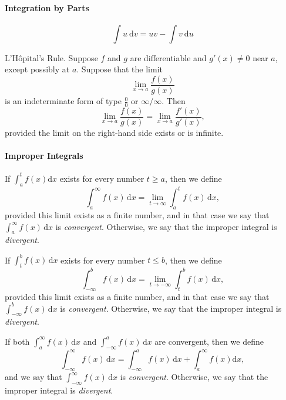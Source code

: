 \documentclass[captions=tableheading]{scrbook}
\begin{document}
\paragraph*{Integration by Parts}

\begin{equation}
\int u\:\mathrm{d} v=uv-\int v\:\mathrm{d} u
\end{equation}
\begin{thm}
L'H\^ opital's Rule. Suppose \(f\) and \(g\) are differentiable and \(g'(x)\neq0\) near \(a\), except possibly at \(a\). Suppose that the limit 
\begin{equation}
\lim_{x\to a}\frac{f(x)}{g(x)}
\end{equation}
is an indeterminate form of type \(\frac{0}{0}\) or \(\infty/\infty\). Then
\begin{equation}
\lim_{x\to a}\frac{f(x)}{g(x)}=\lim_{x\to a}\frac{f'(x)}{g'(x)},
\end{equation}
provided the limit on the right-hand side exists or is infinite.
\end{thm}

\paragraph*{Improper Integrals}

If \(\int_{a}^{t}f(x)\mathrm{d} x\) exists for every number \(t\geq a\), then we define 
\begin{equation}
\int_{a}^{\infty}f(x)\,\mathrm{d} x=\lim_{t\to\infty}\int_{a}^{t}f(x)\,\mathrm{d} x,
\end{equation}
provided this limit exists as a finite number, and in that case we say that \(\int_{a}^{\infty}f(x)\,\mathrm{d} x\) is \emph{convergent}. Otherwise, we say that the improper integral is \emph{divergent}.

If \(\int_{t}^{b}f(x)\,\mathrm{d} x\) exists for every number \(t\leq b\), then we define
\begin{equation}
\int_{-\infty}^{b}f(x)\,\mathrm{d} x=\lim_{t\to-\infty}\int_{t}^{b}f(x)\,\mathrm{d} x,
\end{equation}
provided this limit exists as a finite number, and in that case we say that \(\int_{-\infty}^{b}f(x)\,\mathrm{d} x\) is \emph{convergent}. Otherwise, we say that the improper integral is \emph{divergent}.

If both \(\int_{a}^{\infty}f(x)\,\mathrm{d} x\) and \(\int_{-\infty}^{a}f(x)\,\mathrm{d} x\) are convergent, then we define
\begin{equation}
\int_{-\infty}^{\infty}f(x)\,\mathrm{d} x=\int_{-\infty}^{a}f(x)\,\mathrm{d} x+\int_{a}^{\infty}f(x)\mathrm{d} x,
\end{equation}
and we say that \(\int_{-\infty}^{\infty}f(x)\,\mathrm{d} x\) is \emph{convergent}. Otherwise, we say that the improper integral is \emph{divergent}.
\end{document}
